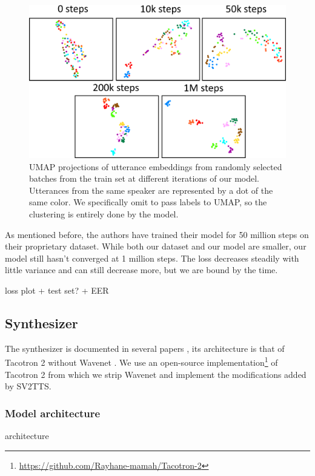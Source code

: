 \documentclass[a4paper, oneside, 12pt, english]{article}
\begin{document}
\begin{figure}[h]
	\centering
	\includegraphics[width=\linewidth]{images/training_umap.png}
	\caption{UMAP projections of utterance embeddings from randomly selected batches from the train set at different iterations of our model. Utterances from the same speaker are represented by a dot of the same color. We specifically omit to pass labels to UMAP, so the clustering is entirely done by the model.}
	\label{training_umap}
\end{figure}

As mentioned before, the authors have trained their model for 50 million steps on their proprietary dataset. While both our dataset and our model are smaller, our model still hasn't converged at 1 million steps. The loss decreases steadily with little variance and can still decrease more, but we are bound by the time.

\color{red} loss plot + test set? + EER \color{black}



\subsection{Synthesizer} \label{synthesizer}
The synthesizer is documented in several papers \citep{Tacotron1, Tacotron2, SV2TTS}, its architecture is that of Tacotron 2 without Wavenet \citep{WaveNet}. We use an open-source implementation\footnote{\url{https://github.com/Rayhane-mamah/Tacotron-2}} of Tacotron 2 from which we strip Wavenet and implement the modifications added by SV2TTS.

\subsubsection{Model architecture}
\color{red} architecture \color{black}
\end{document}
